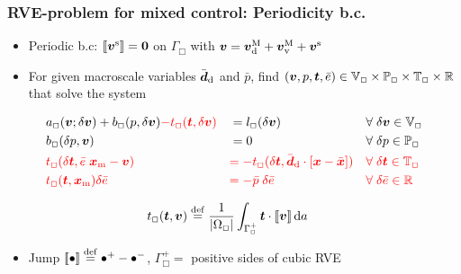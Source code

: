 \documentclass[11pt]{beamer} %
\newcommand{\jump}[1]{[\![#1]\!]}
\renewcommand{\dev}{\mathrm{d}}
\renewcommand{\vol}{\mathrm{v}}
\begin{document}
\begin{frame}
\frametitle{RVE-problem for mixed control: Periodicity b.c.}
 \begin{itemize}
  \item Periodic b.c: $ \jump{\ta v^\fluct} = \ta 0$ on $\Gamma_\Box$ with $\ta v = \ta v^\macro_\dev + \ta v^\macro_\vol + \ta v^\fluct$ 
  \item For given macroscale variables $\bar{\ts d}_\dev$ and $\bar p$, find $(\boldsymbol{v}, p, \boldsymbol{t}, \bar{e}) \in\mathbb{V}_\Box\times\mathbb{P}_\Box\times\mathbb{T}_\Box\times\mathbb{R}$ that solve the system
 \end{itemize}
\vspace{-2truemm}
\begin{align*}
 &a_\Box(\ta v; \delta\ta v) + b_\Box(p,\delta\ta v) {\color{red}- t_\Box(\ta t,\delta\ta v)} &&= l_\Box(\delta\ta v)
&&\forall\;\delta\ta v\in \set{V}_\Box
\\
 &b_\Box(\delta p, \ta v) &&= 0
&&\forall\;\delta p\in\set{P}_\Box
\\
 &{\color{red}t_\Box(\delta\ta t, \bar{e}\;\ta x_\mean - \ta v)} &&{\color{red} = -t_\Box(\delta\ta t, \bar{\ts d}_\dev\cdot[\ta x-\bar{\ta x}])}
&&{\color{red}\forall\;\delta\ta t\in\set{T}_\Box}
\\
 &{\color{red}t_\Box(\ta t, \ta x_\mean) \delta\bar{e}} &&{\color{red}= -\bar p\;\delta\bar{e} }
&&{\color{red}\forall\;\delta\bar{e}\in\set{R}}
\end{align*}

\vspace{-5truemm}
\begin{align*}
 t_\Box(\ta t, \ta v) &\defeq \frac{1}{|\Omega_\Box|}\int_{\Gamma_\Box^+} \ta t \cdot \jump{\ta v} \dif a
\end{align*}
\begin{itemize}
  \item Jump $\jump{\bullet} \defeq \bullet^+ - \bullet^-$, $\Gamma_\Box^+ =$ positive sides of cubic RVE
\end{itemize}
\end{frame}

\end{document}
